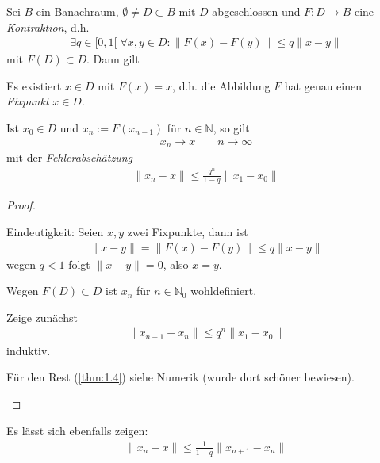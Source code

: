 \begin{theorem} \label{thm:1.3}
  Sei $B$ ein Banachraum, $\emptyset \neq D \subset B$ mit $D$ abgeschlossen und $F: D \to B$ eine \emph{Kontraktion}, d.h.
  \begin{align*}
    \exists q \in [0,1[ \; \forall x,y \in D : \|F(x) - F(y)\| \le q\|x-y\|
  \end{align*}
  mit $F(D) \subset D$. Dann gilt
  \begin{enum-arab}
  \item
    Es existiert $x\in D$ mit $F(x)=x$, d.h. die Abbildung $F$ hat genau einen \emph{Fixpunkt} $x\in D$.
  \item
    Ist $x_0 \in D$ und $x_n := F(x_{n-1})$ für $n\in \mathbb{N}$, so gilt
    \begin{align*}
      x_n \to x \qquad n \to \infty
    \end{align*}
    mit der \emph{Fehlerabschätzung}
    \begin{align*}
      \|x_n - x\| \le \frac{q^n}{1-q} \|x_1 - x_0\|
    \end{align*}
  \end{enum-arab}
  \begin{proof}
    \begin{enum-arab}
    \item
      Eindeutigkeit: Seien $x,y$ zwei Fixpunkte, dann ist
      \begin{align*}
        \|x-y\| = \|F(x) - F(y)\| \le q \|x-y\|
      \end{align*}
      wegen $q < 1$ folgt $\|x-y\| = 0$, also $x=y$.
    \item
      Wegen $F(D) \subset D$ ist $x_n$ für $n\in \mathbb{N}_0$ wohldefiniert.

      Zeige zunächst
      \begin{align*}
        \|x_{n+1} - x_n\| \le q^n \|x_1 - x_0\|
      \end{align*}
      induktiv.

      Für den Rest (\ref{thm:1.4}) siehe Numerik (wurde dort schöner bewiesen).
    \end{enum-arab}
  \end{proof}
\end{theorem}

\begin{notice} \label{thm:1.4}
  Es lässt sich ebenfalls zeigen:
  \begin{align*}
    \|x_n - x\| \le \frac 1{1-q} \|x_{n+1} -x_n \|
  \end{align*}
\end{notice}
